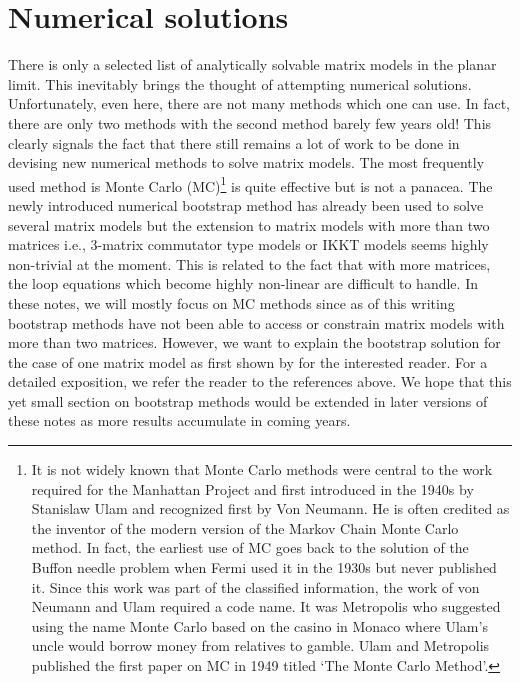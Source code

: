\documentclass[11pt]{article}
\begin{document}
\section{\label{sec:NSOL}Numerical solutions} 
There is only a selected list of analytically solvable matrix models in the planar limit. This inevitably brings 
the thought of attempting numerical solutions. Unfortunately, even here, there are not many methods 
which one can use. In fact, there are only two methods with the second method barely few years old! 
This clearly signals the fact that there still remains a lot of work to be done in devising new numerical 
methods to solve matrix models. The most frequently used method is Monte Carlo (MC)\footnote{
It is not widely known that Monte Carlo methods were central to the work required for the Manhattan Project
and first introduced in the 1940s by Stanislaw Ulam and recognized first by Von Neumann. 
He is often credited as the inventor of the modern version of the Markov Chain Monte Carlo 
method. In fact, the earliest use of MC goes back to the solution of the Buffon needle problem when Fermi used it in the 
1930s but never published it. 
Since this work was part of the classified information, the work of von Neumann and Ulam required a code name. It was Metropolis who 
suggested using the name Monte Carlo based on the casino in 
Monaco where Ulam's uncle would borrow money from relatives to gamble. Ulam and Metropolis
published the first paper on MC in 1949 titled `The Monte Carlo Method'.} 
is quite effective but is not a panacea. 
The newly introduced numerical bootstrap method has already been used to solve several matrix models \cite{Anderson:2016rcw,Lin:2020mme,Han:2020bkb,Kazakov:2021lel} but the extension to matrix models with more than two matrices i.e., 3-matrix commutator type models or IKKT models seems highly non-trivial at the moment. 
This is related to the fact that with more matrices, the loop equations which become highly non-linear are difficult to handle.
In these notes, we will mostly focus on MC methods since as of this writing bootstrap methods have not been able to access or constrain matrix models with more than two matrices. However, we want to explain the bootstrap solution for the case of one matrix model as first shown by \cite{Lin:2020mme} for the interested reader. For a detailed exposition, we refer the reader to the references above. 
We hope that this yet small section on bootstrap methods would be extended in later versions 
of these notes as more results accumulate in coming years. 
\end{document}
